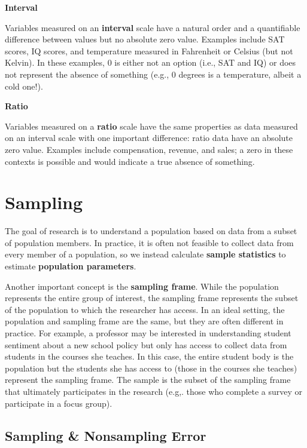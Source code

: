 \documentclass[
]{book}
\begin{document}
\textbf{Interval}

Variables measured on an \textbf{interval} scale have a natural order and a quantifiable difference between values but no absolute zero value. Examples include SAT scores, IQ scores, and temperature measured in Fahrenheit or Celsius (but not Kelvin). In these examples, 0 is either not an option (i.e., SAT and IQ) or does not represent the absence of something (e.g., 0 degrees is a temperature, albeit a cold one!).

\textbf{Ratio}

Variables measured on a \textbf{ratio} scale have the same properties as data measured on an interval scale with one important difference: ratio data have an absolute zero value. Examples include compensation, revenue, and sales; a zero in these contexts is possible and would indicate a true absence of something.

\hypertarget{sampling}{%
\section{Sampling}\label{sampling}}

The goal of research is to understand a population based on data from a subset of population members. In practice, it is often not feasible to collect data from every member of a population, so we instead calculate \textbf{sample statistics} to estimate \textbf{population parameters}.

Another important concept is the \textbf{sampling frame}. While the population represents the entire group of interest, the sampling frame represents the subset of the population to which the researcher has access. In an ideal setting, the population and sampling frame are the same, but they are often different in practice. For example, a professor may be interested in understanding student sentiment about a new school policy but only has access to collect data from students in the courses she teaches. In this case, the entire student body is the population but the students she has access to (those in the courses she teaches) represent the sampling frame. The sample is the subset of the sampling frame that ultimately participates in the research (e.g,. those who complete a survey or participate in a focus group).

\hypertarget{sampling-nonsampling-error}{%
\subsection{Sampling \& Nonsampling Error}\label{sampling-nonsampling-error}}
\end{document}

